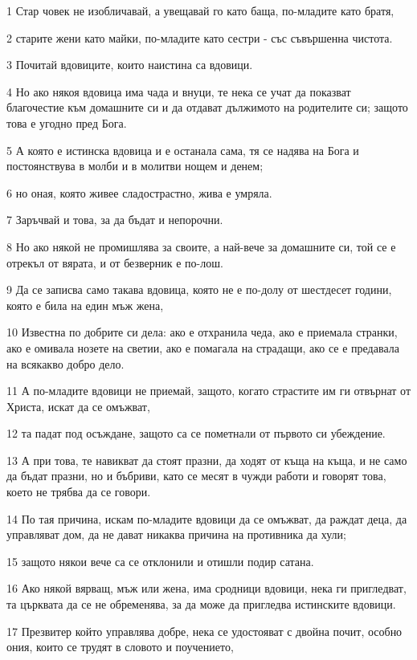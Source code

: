 \par 1 Стар човек не изобличавай, а увещавай го като баща, по-младите като братя,
\par 2 старите жени като майки, по-младите като сестри - със съвършенна чистота.
\par 3 Почитай вдовиците, които наистина са вдовици.
\par 4 Но ако някоя вдовица има чада и внуци, те нека се учат да показват благочестие към домашните си и да отдават дължимото на родителите си; защото това е угодно пред Бога.
\par 5 А която е истинска вдовица и е останала сама, тя се надява на Бога и постоянствува в молби и в молитви нощем и денем;
\par 6 но оная, която живее сладострастно, жива е умряла.
\par 7 Заръчвай и това, за да бъдат и непорочни.
\par 8 Но ако някой не промишлява за своите, а най-вече за домашните си, той се е отрекъл от вярата, и от безверник е по-лош.
\par 9 Да се записва само такава вдовица, която не е по-долу от шестдесет години, която е била на един мъж жена,
\par 10 Известна по добрите си дела: ако е отхранила чеда, ако е приемала странки, ако е омивала нозете на светии, ако е помагала на страдащи, ако се е предавала на всякакво добро дело.
\par 11 А по-младите вдовици не приемай, защото, когато страстите им ги отвърнат от Христа, искат да се омъжват,
\par 12 та падат под осъждане, защото са се пометнали от първото си убеждение.
\par 13 А при това, те навикват да стоят празни, да ходят от къща на къща, и не само да бъдат празни, но и бъбриви, като се месят в чужди работи и говорят това, което не трябва да се говори.
\par 14 По тая причина, искам по-младите вдовици да се омъжват, да раждат деца, да управляват дом, да не дават никаква причина на противника да хули;
\par 15 защото някои вече са се отклонили и отишли подир сатана.
\par 16 Ако някой вярващ, мъж или жена, има сродници вдовици, нека ги пригледват, та църквата да се не обременява, за да може да пригледва истинските вдовици.
\par 17 Презвитер който управлява добре, нека се удостояват с двойна почит, особно ония, които се трудят в словото и поучението,
